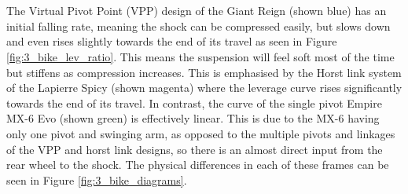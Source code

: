 		\\\\
		The Virtual Pivot Point (VPP) design of the Giant Reign (shown blue) has an initial falling rate, meaning the shock can be compressed easily, but slows down and even rises slightly towards the end of its travel as seen in Figure \ref{fig:3_bike_lev_ratio}. This means the suspension will feel soft most of the time but stiffens as compression increases. This is emphasised by the Horst link system of the Lapierre Spicy (shown magenta) where the leverage curve rises significantly towards the end of its travel. In contrast, the curve of the single pivot Empire MX-6 Evo (shown green) is effectively linear. This is due to the MX-6 having only one pivot and swinging arm, as opposed to the multiple pivots and linkages of the VPP and horst link designs, so there is an almost direct input from the rear wheel to the shock. The physical differences in each of these frames can be seen in Figure \ref{fig:3_bike_diagrams}.
